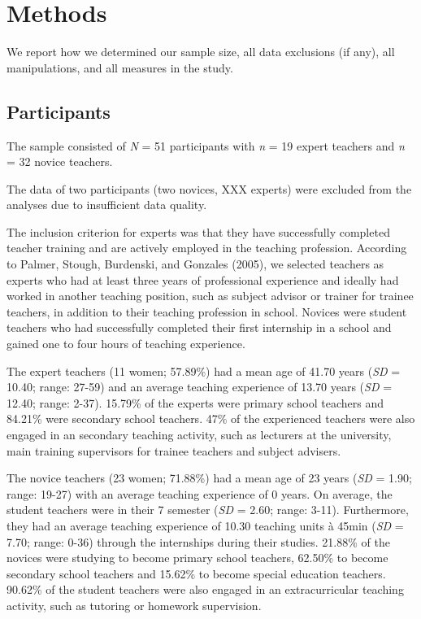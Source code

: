 \documentclass[
  man]{apa6}
\begin{document}
\hypertarget{methods}{%
\section{Methods}\label{methods}}

We report how we determined our sample size, all data exclusions (if any), all manipulations, and all measures in the study.

\hypertarget{participants}{%
\subsection{Participants}\label{participants}}

The sample consisted of \emph{N} = 51 participants with \emph{n} = 19 expert teachers and \emph{n} = 32 novice teachers.

The data of two participants (two novices, XXX experts) were excluded from the analyses due to insufficient data quality.

The inclusion criterion for experts was that they have successfully completed teacher training and are actively employed in the teaching profession. According to Palmer, Stough, Burdenski, and Gonzales (2005), we selected teachers as experts who had at least three years of professional experience and ideally had worked in another teaching position, such as subject advisor or trainer for trainee teachers, in addition to their teaching profession in school. Novices were student teachers who had successfully completed their first internship in a school and gained one to four hours of teaching experience.

The expert teachers (11 women; 57.89\%) had a mean age of 41.70 years (\emph{SD} = 10.40; range: 27-59) and an average teaching experience of 13.70 years (\emph{SD} = 12.40; range: 2-37).
15.79\% of the experts were primary school teachers and 84.21\% were secondary school teachers. 47\% of the experienced teachers were also engaged in an secondary teaching activity, such as lecturers at the university, main training supervisors for trainee teachers and subject advisers.

The novice teachers (23 women; 71.88\%) had a mean age of 23 years (\emph{SD} = 1.90; range: 19-27) with an average teaching experience of 0 years. On average, the student teachers were in their 7 semester (\emph{SD} = 2.60; range: 3-11). Furthermore, they had an average teaching experience of 10.30 teaching units à 45min (\emph{SD} = 7.70; range: 0-36) through the internships during their studies.
21.88\% of the novices were studying to become primary school teachers, 62.50\% to become secondary school teachers and 15.62\% to become special education teachers. 90.62\% of the student teachers were also engaged in an extracurricular teaching activity, such as tutoring or homework supervision.
\end{document}
